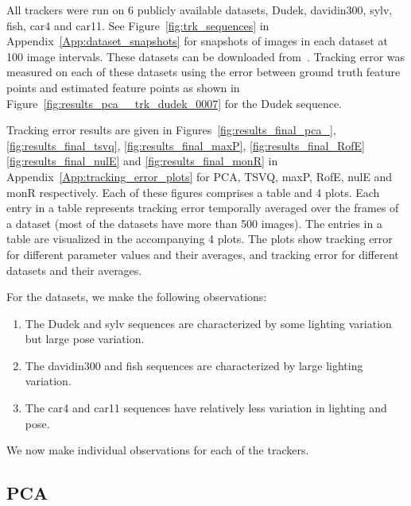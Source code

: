 All trackers were run on 6 publicly available datasets, Dudek, davidin300, sylv, fish, car4 and car11.  See Figure~\ref{fig:trk_sequences} in Appendix~\ref{App:dataset_snapshots} for snapshots of images in each dataset at 100 image intervals.  These datasets can be downloaded from~\cite{2008_JNL_subspaceTRK_Ross}.  Tracking error was measured on each of these datasets using the error between ground truth feature points and estimated feature points as shown in Figure~\ref{fig:results_pca__trk_dudek_0007} for the Dudek sequence.

Tracking error results are given in Figures~\ref{fig:results_final_pca_}, \ref{fig:results_final_tsvq}, \ref{fig:results_final_maxP}, \ref{fig:results_final_RofE} \ref{fig:results_final_nulE} and \ref{fig:results_final_monR} in Appendix~\ref{App:tracking_error_plots} for PCA, TSVQ, maxP, RofE, nulE and monR respectively.  Each of these figures comprises a table and 4 plots.  Each entry in a table represents tracking error temporally averaged over the frames of a dataset (most of the datasets have more than 500 images).  The entries in a table are visualized in the accompanying 4 plots.  The plots show tracking error for different parameter values and their averages, and tracking error for different datasets and their averages.  

For the datasets, we make the following observations:

\begin{enumerate}
\item The Dudek and sylv sequences are characterized by some lighting variation but large pose variation.
\item The davidin300 and fish sequences are characterized by large lighting variation.
\item The car4 and car11 sequences have relatively less variation in lighting and pose.
\end{enumerate}

We now make individual observations for each of the trackers.

\subsection{PCA}

